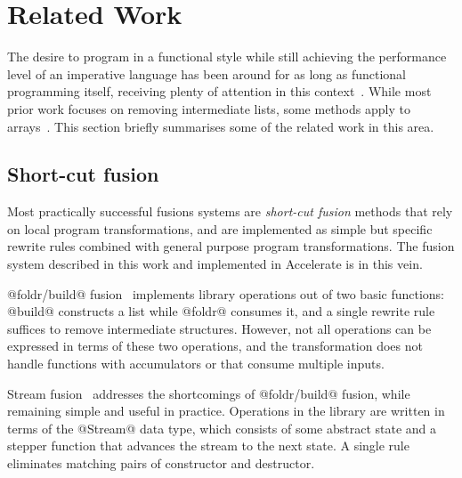 \section{Related Work}
\label{sec:fusion_related_work}

The desire to program in a functional style while still achieving the
performance level of an imperative language has been around for as long as
functional programming itself, receiving plenty of attention in this
context~\cite{Coutts:2007kp,Gill:1993de,Hu:1997tk,Meijer:1991,Rompf:2013er,Takano:1995,Wadler:1984ia,Waters:1991fp}.
While most prior work focuses on removing intermediate lists, some methods apply
to arrays~\cite{Chakravarty:2001dt,Claessen:2012hl,Grelck:2006ci,Keller:2010er}.
This section briefly summarises some of the related work in this area.


\subsection{Short-cut fusion}

Most practically successful fusions systems are \emph{short-cut fusion}
 methods that rely on local program transformations, and
are implemented as simple but specific rewrite rules combined with general
purpose program transformations. The fusion system described in this work and
implemented in Accelerate is in this vein.


@foldr/build@ fusion~\cite{Gill:1996tf,Gill:1993de}
implements library operations out of two basic functions: @build@
constructs a list while @foldr@ consumes it, and a single rewrite rule suffices
to remove intermediate structures. However, not all operations can be expressed
in terms of these two operations, and the transformation does not handle
functions with accumulators or that consume multiple inputs.

Stream fusion~\cite{Coutts:2007kp} addresses the
shortcomings of @foldr/build@ fusion, while remaining simple and useful in
practice. Operations in the library are written in terms of the @Stream@ data
type, which consists of some abstract state and a stepper function that advances
the stream to the next state. A single rule eliminates matching pairs of
constructor and destructor.

